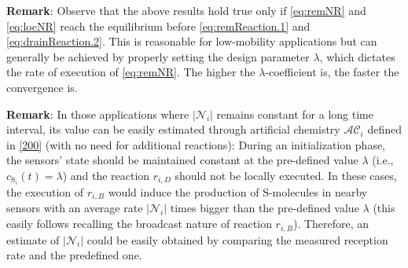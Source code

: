 \documentclass[journal]{IEEEtran}
\newcommand{\mol}[1]{\ensuremath{\textrm{#1}}}
\begin{document}
{{\bf{Remark}}: Observe that the above results hold true only if \eqref{eq:remNR} and \eqref{eq:locNR} reach the equilibrium before \eqref{eq:remReaction.1} and \eqref{eq:drainReaction.2}. This is reasonable for low-mobility applications but can generally be achieved by properly setting the design parameter $\lambda$, which dictates the rate of execution of \eqref{eq:remNR}. The higher the $\lambda$-coefficient is, the faster the convergence is.} 

{{\bf{Remark}}: In those applications where $|\mathcal{N}_{i}|$ remains constant for a long time interval, its value can be easily estimated through artificial chemistry $\mathcal{AC}_i$ defined in \eqref{200} (with no need for additional reactions): During an initialization phase, the sensors' state should be maintained constant at the pre-defined value $\lambda$ (i.e., $c_{\mol{S}_i}(t) = \lambda$) and the reaction $r_{i,D}$ should not be locally executed. {In these cases}, the execution of $r_{i,B}$ would induce the production of \mol{S}-molecules in nearby sensors with an average rate $|\mathcal{N}_{i}|$ times bigger than the pre-defined value $\lambda$ (this easily follows recalling the broadcast nature of reaction $r_{i,B}$). Therefore, an estimate of $|\mathcal{N}_{i}|$ could be easily obtained by comparing the measured reception rate and the predefined one.} 
\end{document}

